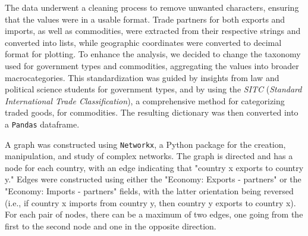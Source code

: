 \documentclass[12pt, a4paper]{article}
\begin{document}

The data underwent a cleaning process to remove unwanted characters, ensuring that the values were in a usable format. Trade partners for both exports and imports, as well as commodities, were extracted from their respective strings and converted into lists, while geographic coordinates were converted to decimal format for plotting. To enhance the analysis, we decided to change the taxonomy used for government types and commodities, aggregating the values into broader macrocategories. This standardization was guided by insights from law and political science students for government types, and by using the \textit{SITC} (\textit{Standard International Trade Classification}), a comprehensive method for categorizing traded goods, for commodities. The resulting dictionary was then converted into a \texttt{Pandas} dataframe.\\

\begin{table}[h]
\centering
\small
{}
\captionsetup{font=scriptsize,labelfont=bf}
\caption{Comparison of categorical fields before and after cleaning.}
\label{tab:network_stats}
\end{table}

A graph was constructed using \texttt{Networkx}, a Python package for the creation, manipulation, and study of complex networks. The graph is directed and has a node for each country, with an edge indicating that "country x exports to country y." Edges were constructed using either the "Economy: Exports - partners" or the "Economy: Imports - partners" fields, with the latter orientation being reversed (i.e., if country x imports from country y, then country y exports to country x). For each pair of nodes, there can be a maximum of two edges, one going from the first to the second node and one in the opposite direction.
\end{document}
